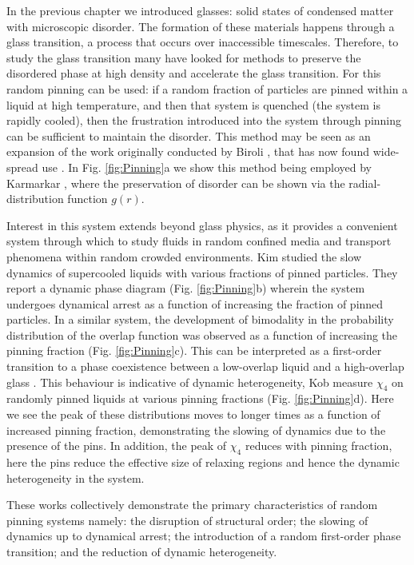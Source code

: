 In the previous chapter we introduced glasses: solid states of condensed matter with microscopic disorder. The formation of these materials happens through a glass transition, a process that occurs over inaccessible timescales. Therefore, to study the glass transition many have looked for methods to preserve the disordered phase at high density and accelerate the glass transition. For this random pinning can be used: if a random fraction of particles are pinned within a liquid at high temperature, and then that system is quenched (the system is rapidly cooled), then the frustration introduced into the system through pinning can be sufficient to maintain the disorder. This method may be seen as an expansion of the work originally conducted by Biroli \etal \cite{biroli2008}, that has now found wide-spread use \cite{cammarota2012,gokhale2014a,kob2014,li2015}. In Fig. \ref{fig:Pinning}a we show this method being employed by Karmarkar \etal \cite{karmakar2013}, where the preservation of disorder can be shown via the radial-distribution function $g(r)$.  

Interest in this system extends beyond glass physics, as it provides a convenient system through which to study fluids in random confined media and transport phenomena within random crowded environments. Kim \etal \cite{kim2011} studied the slow dynamics of supercooled liquids with various fractions of pinned particles. They report a dynamic phase diagram (Fig. \ref{fig:Pinning}b) wherein the system undergoes dynamical arrest as a function of increasing the fraction of pinned particles. 
In a similar system, the development of bimodality in the probability distribution of the overlap function was observed as a function of increasing the pinning fraction (Fig. \ref{fig:Pinning}c). This can be interpreted as a first-order transition to a phase coexistence between a low-overlap liquid and a high-overlap glass \cite{kob2013}. 
This behaviour is indicative of dynamic heterogeneity, Kob \etal \cite{kob2014} measure $\chi_4$ on randomly pinned liquids at various pinning fractions (Fig. \ref{fig:Pinning}d). Here we see the peak of these distributions moves to longer times as a function of increased pinning fraction, demonstrating the slowing of dynamics due to the presence of the pins. In addition, the peak of $\chi_4$ reduces with pinning fraction, here the pins reduce the effective size of relaxing regions and hence the dynamic heterogeneity in the system.

These works collectively demonstrate the primary characteristics of random pinning systems namely: the disruption of structural order; the slowing of dynamics up to dynamical arrest; the introduction of a random first-order phase transition; and the reduction of dynamic heterogeneity.  

